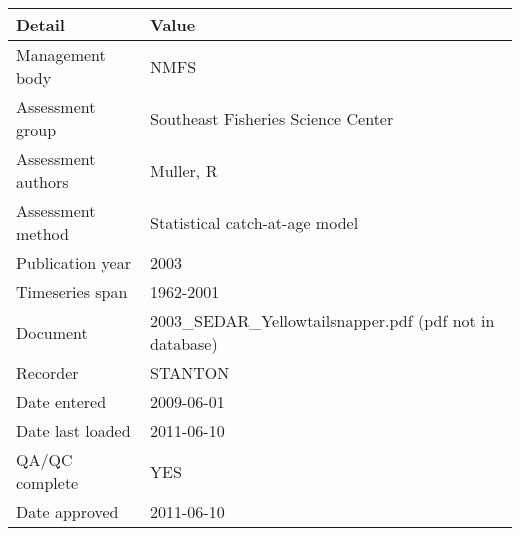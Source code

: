 \begin{table}[htb]
\centering
\begin{tabular}{lp{7cm}}
\toprule
Detail & Value \\
\midrule
Management body    & NMFS                                                     \\
Assessment group   & Southeast Fisheries Science Center                       \\
Assessment authors & Muller, R                                                \\
Assessment method  & Statistical catch-at-age model                           \\
Publication year   & 2003                                                     \\
Timeseries span    & 1962-2001                                                \\
Document           & 2003\_SEDAR\_Yellowtailsnapper.pdf (pdf not in database) \\
Recorder           & STANTON                                                  \\
Date entered       & 2009-06-01                                               \\
Date last loaded   & 2011-06-10                                               \\
QA/QC complete     & YES                                                      \\
Date approved      & 2011-06-10                                               \\
\bottomrule
\end{tabular}
\label{tab:assessdet}
\end{table}
